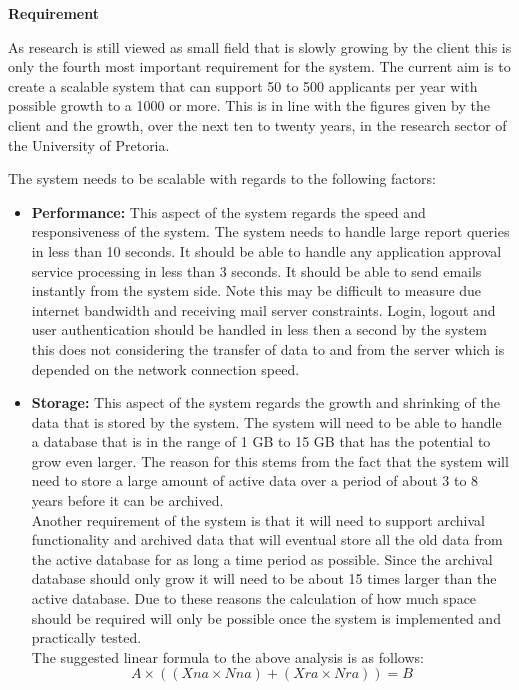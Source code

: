 \begin{flushleft}
\vspace{0.1in}

\textbf{Requirement}

As research is still viewed as small field that is slowly growing by the client this is only the fourth most important requirement for the system. The current aim is to create a scalable system that can support 50 to 500 applicants per year with possible growth to a 1000 or more. This is in line with the figures given by the client and the growth, over the next ten to twenty years, in the research sector of the University of Pretoria.\\
\vspace{0.05in}

The system needs to be scalable with regards to the following factors:
\begin{itemize}

\item\textbf{Performance:} This aspect of the system regards the speed and responsiveness of the system.
The system needs to handle large report queries in less than 10 seconds. It should be able to handle any application approval service processing in less than 3 seconds. It should be able to send emails instantly from the system side. Note this may be difficult to measure due internet bandwidth and receiving mail server constraints. Login, logout and user authentication should be handled in less then a second by the system this does not  considering the transfer of data to and from the server which is depended on the network connection speed.\\

\item\textbf{Storage:} This aspect of the system regards the growth and shrinking of the data that is stored by the system.
The system will need to be able to handle a database that is in the range of 1 GB to 15 GB that has the potential to grow even larger. The reason for this stems from the fact that the system will need to store a large amount of active data over a period of about 3 to 8 years before it can be archived.
\\Another requirement of the system is that it will need to support archival functionality and archived data that will eventual store all the old data from the active database for as long a time period as possible. Since the archival database should only grow it will need to be about 15 times larger than the active database. Due to these reasons the calculation of how much space should be required will only be possible once the system is implemented and practically tested.\\The suggested linear formula to the above analysis is as follows: 
\begin{equation}
A \times ( (Xna \times Nna) + (Xra \times Nra) ) = B
\end{equation}


\end{itemize}
\end{flushleft}
